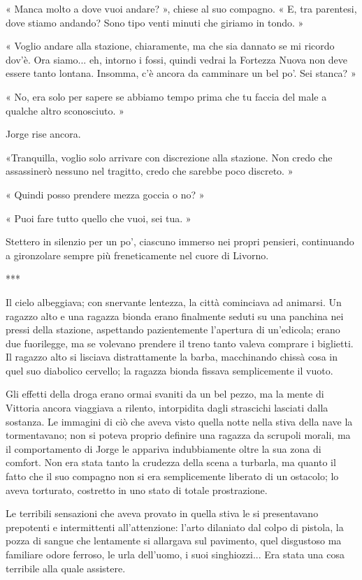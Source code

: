« Manca molto a dove vuoi andare? », chiese al suo compagno. « E, tra parentesi, dove stiamo andando? Sono tipo venti minuti che giriamo in tondo. »

« Voglio andare alla stazione, chiaramente, ma che sia dannato se mi ricordo dov'è.  Ora siamo... eh, intorno i fossi, quindi vedrai la Fortezza Nuova non deve essere tanto lontana. Insomma, c'è ancora da camminare un bel po'. Sei stanca? »

« No, era solo per sapere se abbiamo tempo prima che tu faccia del male a qualche altro sconosciuto. »

Jorge rise ancora.

«Tranquilla, voglio solo arrivare con discrezione alla stazione. Non credo che assassinerò nessuno nel tragitto, credo che sarebbe poco discreto. »

« Quindi posso prendere mezza goccia o no? »

« Puoi fare tutto quello che vuoi, sei tua. »

Stettero in silenzio per un po', ciascuno immerso nei propri pensieri, continuando a gironzolare sempre più freneticamente nel cuore di Livorno.

***

Il cielo albeggiava; con snervante lentezza, la città cominciava ad animarsi. Un ragazzo alto e una ragazza bionda erano finalmente seduti su una panchina nei pressi della stazione, aspettando pazientemente l'apertura di un'edicola; erano due fuorilegge, ma se volevano prendere il treno tanto valeva comprare i biglietti. Il ragazzo alto si lisciava distrattamente la barba, macchinando chissà cosa in quel suo diabolico cervello; la ragazza bionda fissava semplicemente il vuoto.

Gli effetti della droga erano ormai svaniti da un bel pezzo, ma la mente di Vittoria ancora viaggiava a rilento, intorpidita dagli strascichi lasciati dalla sostanza. Le immagini di ciò che aveva visto quella notte nella stiva della nave la tormentavano; non si poteva proprio definire una ragazza da scrupoli morali, ma il comportamento di Jorge le appariva indubbiamente oltre la sua zona di comfort. Non era stata tanto la crudezza della scena a turbarla, ma quanto il fatto che il suo compagno non si era semplicemente liberato di un ostacolo; lo aveva torturato, costretto in uno stato di totale prostrazione.

Le terribili sensazioni che aveva provato in quella stiva le si presentavano prepotenti e intermittenti all'attenzione: l'arto dilaniato dal colpo di pistola, la pozza di sangue che lentamente si allargava sul pavimento, quel disgustoso ma familiare odore ferroso, le urla dell'uomo, i suoi singhiozzi... Era stata una cosa terribile alla quale assistere.

